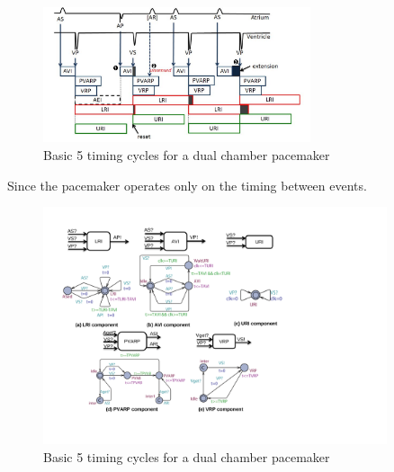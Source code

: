 \begin{figure}[!t]
\center
\includegraphics[width=0.7\textwidth]{figs/PM_timers.pdf}
\caption{Basic 5 timing cycles for a dual chamber pacemaker}
\label{fig:PMtimers}

\end{figure} 
Since the pacemaker operates only on the timing between events. 
\begin{figure}[!t]
\center
\includegraphics[width=0.9\textwidth]{figs/pacemaker.pdf}
\caption{Basic 5 timing cycles for a dual chamber pacemaker}
\label{fig:PMdesign}
\end{figure} 
